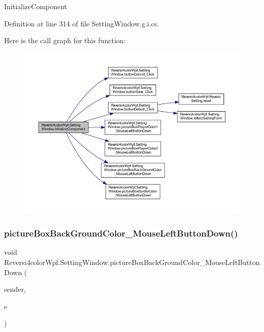 Initialize\+Component 



Definition at line 314 of file Setting\+Window.\+g.\+i.\+cs.

Here is the call graph for this function\+:
\nopagebreak
\begin{figure}[H]
\begin{center}
\leavevmode
\includegraphics[width=350pt]{class_reversi4color_wpf_1_1_setting_window_ac85da370c146e04c94ae2535845b603f_cgraph}
\end{center}
\end{figure}
\mbox{\label{class_reversi4color_wpf_1_1_setting_window_a40fbee94e6f54854efe0e29d2e4252fb}} 
\subsubsection{\texorpdfstring{picture\+Box\+Back\+Ground\+Color\+\_\+\+Mouse\+Left\+Button\+Down()}{pictureBoxBackGroundColor\_MouseLeftButtonDown()}}
{\footnotesize\ttfamily void Reversi4color\+Wpf.\+Setting\+Window.\+picture\+Box\+Back\+Ground\+Color\+\_\+\+Mouse\+Left\+Button\+Down (\begin{DoxyParamCaption}\item[{object}]{sender,  }\item[{Mouse\+Button\+Event\+Args}]{e }\end{DoxyParamCaption})\hspace{0.3cm}{\ttfamily [private]}}



